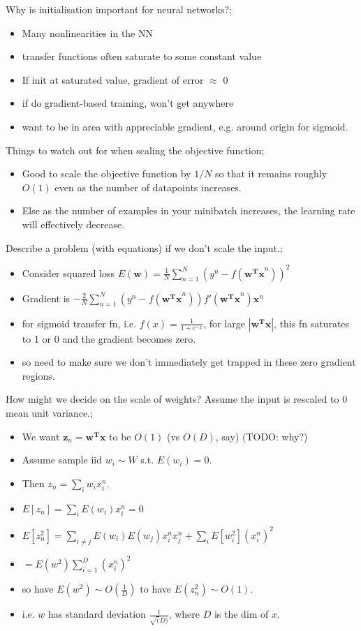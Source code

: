 \documentclass{article}
\begin{document}
Why is initialisation important for neural networks?; \begin{itemize} \item Many nonlinearities in the NN \item transfer functions often saturate to some constant value \item If init at saturated value, gradient of error $\approx$ 0 \item if do gradient-based training, won't get anywhere \item want to be in area with appreciable gradient, e.g. around origin for sigmoid. \end{itemize}

Things to watch out for when scaling the objective function; \begin{itemize} \item Good to scale the objective function by $1/N$ so that it remains roughly $O(1)$ even as the number of datapoints increases. \item Else as the number of examples in your minibatch increases, the learning rate will effectively decrease. \end{itemize} 

Describe a problem (with equations) if we don't scale the input.; \begin{itemize} \item Consider squared loss $E(\bm{w}) = \frac{1}{N}\sum_{n=1}^N (y^n - f(\bm{w^Tx}^n))^2$ \item Gradient is $-\frac{2}{N}\sum_{n=1}^N(y^n - f(\bm{w^Tx}^n))f'(\bm{w^Tx}^n)\bm{x}^n$ \item for sigmoid transfer fn, i.e. $f(x) = \frac{1}{1+e^{-x}}$, for large $|\mathbf{w^Tx}|$, this fn saturates to 1 or 0 and the gradient becomes zero. \item so need to make sure we don't immediately get trapped in these zero gradient regions. \end{itemize}

How might we decide on the scale of weights? Assume the input is rescaled to 0 mean unit variance.; \begin{itemize} \item We want $\mathbf{z}_n = \mathbf{w^Tx}$ to be $O(1)$ (vs $O(D)$, say) (TODO: why?) \item Assume sample iid $w_i \sim W$ s.t. $E(w_i) = 0$. \item Then $z_n = \sum_i w_i x^n_i$.  \item $E[z_n] = \sum_i E(w_i)x_i^n = 0$ \item $E[z_n^2] = \sum_{i\ne j} E(w_i)E(w_j)x_i^nx_j^n + \sum_i E[w_i^2](x_i^n)^2$ \item $=E(w^2)\sum_{i=1}^D(x_i^n)^2$ \item so have $E(w^2) \sim O(\frac{1}{D})$ to have $E(z_n^2)\sim O(1)$. \item i.e. $w$ has standard deviation $\frac{1}{\sqrt(D)}$, where $D$ is the dim of $x$. \end{itemize}
\end{document}
